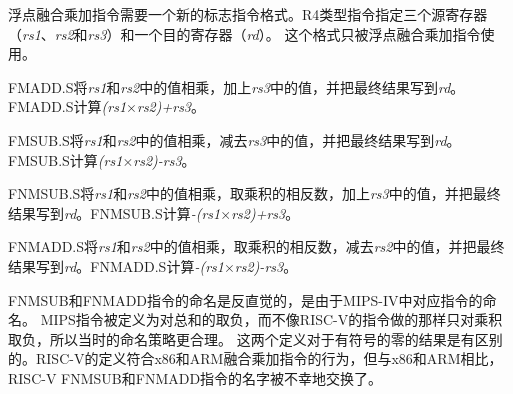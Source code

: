 浮点融合乘加指令需要一个新的标志指令格式。R4类型指令指定三个源寄存器（{\em rs1}、{\em rs2}和{\em rs3}）和一个目的寄存器（{\em rd}）。
这个格式只被浮点融合乘加指令使用。

FMADD.S将{\em rs1}和{\em rs2}中的值相乘，加上{\em rs3}中的值，并把最终结果写到{\em rd}。FMADD.S计算{\em (rs1$\times$rs2)+rs3}。

FMSUB.S将{\em rs1}和{\em rs2}中的值相乘，减去{\em rs3}中的值，并把最终结果写到{\em rd}。FMSUB.S计算{\em (rs1$\times$rs2)-rs3}。

FNMSUB.S将{\em rs1}和{\em rs2}中的值相乘，取乘积的相反数，加上{\em rs3}中的值，并把最终结果写到{\em rd}。FNMSUB.S计算{\em -(rs1$\times$rs2)+rs3}。

FNMADD.S将{\em rs1}和{\em rs2}中的值相乘，取乘积的相反数，减去{\em rs2}中的值，并把最终结果写到{\em rd}。FNMADD.S计算{\em -(rs1$\times$rs2)-rs3}。

\begin{commentary}
  FNMSUB和FNMADD指令的命名是反直觉的，是由于MIPS-IV中对应指令的命名。
  MIPS指令被定义为对总和的取负，而不像RISC-V的指令做的那样只对乘积取负，所以当时的命名策略更合理。
  这两个定义对于有符号的零的结果是有区别的。RISC-V的定义符合x86和ARM融合乘加指令的行为，但与x86和ARM相比，
  RISC-V FNMSUB和FNMADD指令的名字被不幸地交换了。
\end{commentary}

